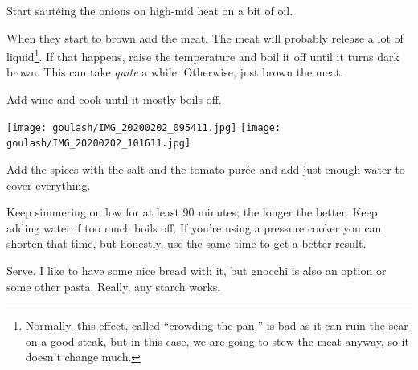 \begin{recipe}
{        \step Start saut\'eing the onions on high-mid heat on a bit of oil.
        
        \vspace{1em}
    
        \step When they start to brown add the meat. The meat will probably release a lot of liquid\footnote{ Normally, this effect, called ``crowding the pan,'' is bad as it can ruin the sear on a good steak, but in this case, we are going to stew the meat anyway, so it doesn’t change much.}. If that happens, raise the temperature and boil it off until it turns dark brown. This can take \textit{quite} a while. Otherwise, just brown the meat.

        \step Add wine and cook until it mostly boils off.
    
        \texttt{[image: goulash/IMG\_20200202\_095411.jpg]}%
        \texttt{[image: goulash/IMG\_20200202\_101611.jpg]}
    
        \step Add the spices with the salt and the tomato pur\'ee and add just enough water to cover everything.

        \step Keep simmering on low for at least 90 minutes; the longer the better. Keep adding water if too much boils off. If you’re using a pressure cooker you can shorten that time, but honestly, use the same time to get a better result.
    
        \step Serve. I like to have some nice bread with it, but gnocchi is also an option or some other pasta. Really, any starch works.
    }
\end{recipe}